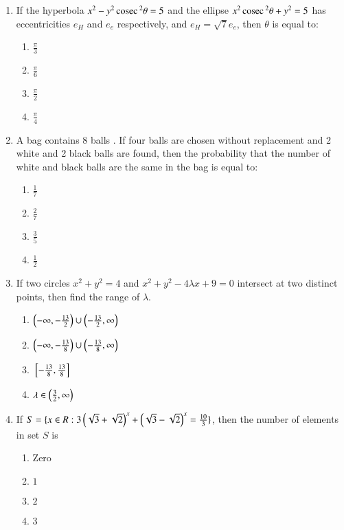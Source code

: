 \documentclass[journal,9pt,onecolumn]{IEEEtran}
\begin{document}
\begin{enumerate}
\item If the hyperbola $x^2 - y^2 \,\text{cosec}\,^2 \theta = 5$ and the ellipse $x^2 \,\text{cosec}\,^2 \theta + y^2 = 5$ has eccentricities $e_H$ and $e_e$ respectively, and $e_H =  \sqrt{7}{e_e}$, then $\theta$ is equal to:
\begin{multicols}{4}
\begin{enumerate}
    \item $\frac{\pi}{3}$
    \item $\frac{\pi}{6}$
    \item $\frac{\pi}{2}$
    \item $\frac{\pi}{4}$
\end{enumerate}
\end{multicols}

\item A bag contains 8 balls . If four balls are chosen without replacement and 2 white  and 2 black  balls are found, then the probability that the number of white and black balls are the same in the bag is equal to:

\begin{multicols}{4}
\begin{enumerate}
    \item $\frac{1}{7}$
    \item $\frac{2}{7}$
    \item $\frac{3}{5}$
    \item $\frac{1}{2}$
\end{enumerate}
\end{multicols}


\item If two circles $x^2 + y^2 = 4$ and $x^2 + y^2 - 4\lambda x + 9 = 0$ intersect at two distinct points, then find the range of $\lambda$.
\begin{multicols}{2}
\begin{enumerate}
    \item $\left( -\infty, -\frac{13}{2}\right) \cup \left( -\frac{13}{2}, \infty\right)$
    \item $\left( -\infty, -\frac{13}{8}\right) \cup \left( -\frac{13}{8}, \infty\right)$
    \item ${}\left[-\frac{13}{8},\frac{13}{8}\right]$
    \item $\lambda \in \left(\frac{3}{2},\infty\right)$
\end{enumerate}
\end{multicols}

\item If $S = \{x \in R : 3\left(\sqrt{3} + \sqrt{2}\right)^x + \left(\sqrt{3} - \sqrt{2}\right)^x = \frac{10}{3} \}$, then the number of elements in set $S$ is
\begin{multicols}{4}
\begin{enumerate}
    \item Zero
    \item $1$
    \item $2$
    \item $3$
\end{enumerate}
\end{multicols}





\end{enumerate}
\end{document}
